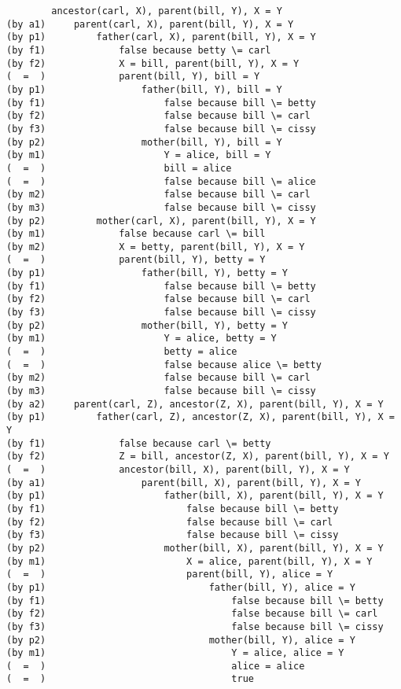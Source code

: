\documentclass[a4paper,11pt,notitlepage,onecolumn]{article}
\begin{document}
\begin{verbatim}
        ancestor(carl, X), parent(bill, Y), X = Y
(by a1)     parent(carl, X), parent(bill, Y), X = Y
(by p1)         father(carl, X), parent(bill, Y), X = Y
(by f1)             false because betty \= carl
(by f2)             X = bill, parent(bill, Y), X = Y
(  =  )             parent(bill, Y), bill = Y
(by p1)                 father(bill, Y), bill = Y
(by f1)                     false because bill \= betty
(by f2)                     false because bill \= carl
(by f3)                     false because bill \= cissy
(by p2)                 mother(bill, Y), bill = Y
(by m1)                     Y = alice, bill = Y
(  =  )                     bill = alice
(  =  )                     false because bill \= alice
(by m2)                     false because bill \= carl
(by m3)                     false because bill \= cissy
(by p2)         mother(carl, X), parent(bill, Y), X = Y
(by m1)             false because carl \= bill
(by m2)             X = betty, parent(bill, Y), X = Y
(  =  )             parent(bill, Y), betty = Y
(by p1)                 father(bill, Y), betty = Y
(by f1)                     false because bill \= betty
(by f2)                     false because bill \= carl
(by f3)                     false because bill \= cissy
(by p2)                 mother(bill, Y), betty = Y
(by m1)                     Y = alice, betty = Y
(  =  )                     betty = alice
(  =  )                     false because alice \= betty
(by m2)                     false because bill \= carl
(by m3)                     false because bill \= cissy
(by a2)     parent(carl, Z), ancestor(Z, X), parent(bill, Y), X = Y
(by p1)         father(carl, Z), ancestor(Z, X), parent(bill, Y), X = Y
(by f1)             false because carl \= betty
(by f2)             Z = bill, ancestor(Z, X), parent(bill, Y), X = Y
(  =  )             ancestor(bill, X), parent(bill, Y), X = Y
(by a1)                 parent(bill, X), parent(bill, Y), X = Y
(by p1)                     father(bill, X), parent(bill, Y), X = Y
(by f1)                         false because bill \= betty
(by f2)                         false because bill \= carl
(by f3)                         false because bill \= cissy
(by p2)                     mother(bill, X), parent(bill, Y), X = Y
(by m1)                         X = alice, parent(bill, Y), X = Y
(  =  )                         parent(bill, Y), alice = Y
(by p1)                             father(bill, Y), alice = Y
(by f1)                                 false because bill \= betty
(by f2)                                 false because bill \= carl
(by f3)                                 false because bill \= cissy
(by p2)                             mother(bill, Y), alice = Y
(by m1)                                 Y = alice, alice = Y
(  =  )                                 alice = alice
(  =  )                                 true
\end{verbatim}
\end{document}
